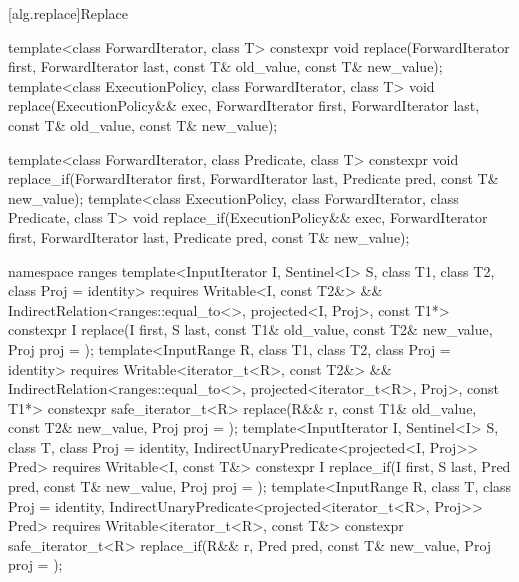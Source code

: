 [alg.replace]{Replace}

%
%
\begin{itemdecl}
template<class ForwardIterator, class T>
  constexpr void replace(ForwardIterator first, ForwardIterator last,
                         const T& old_value, const T& new_value);
template<class ExecutionPolicy, class ForwardIterator, class T>
  void replace(ExecutionPolicy&& exec,
               ForwardIterator first, ForwardIterator last,
               const T& old_value, const T& new_value);

template<class ForwardIterator, class Predicate, class T>
  constexpr void replace_if(ForwardIterator first, ForwardIterator last,
                            Predicate pred, const T& new_value);
template<class ExecutionPolicy, class ForwardIterator, class Predicate, class T>
  void replace_if(ExecutionPolicy&& exec,
                  ForwardIterator first, ForwardIterator last,
                  Predicate pred, const T& new_value);

namespace ranges {
  template<InputIterator I, Sentinel<I> S, class T1, class T2, class Proj = identity>
    requires Writable<I, const T2&> &&
             IndirectRelation<ranges::equal_to<>, projected<I, Proj>, const T1*>
    constexpr I
      replace(I first, S last, const T1& old_value, const T2& new_value, Proj proj = {});
  template<InputRange R, class T1, class T2, class Proj = identity>
    requires Writable<iterator_t<R>, const T2&> &&
             IndirectRelation<ranges::equal_to<>, projected<iterator_t<R>, Proj>, const T1*>
    constexpr safe_iterator_t<R>
      replace(R&& r, const T1& old_value, const T2& new_value, Proj proj = {});
  template<InputIterator I, Sentinel<I> S, class T, class Proj = identity,
           IndirectUnaryPredicate<projected<I, Proj>> Pred>
    requires Writable<I, const T&>
    constexpr I replace_if(I first, S last, Pred pred, const T& new_value, Proj proj = {});
  template<InputRange R, class T, class Proj = identity,
           IndirectUnaryPredicate<projected<iterator_t<R>, Proj>> Pred>
    requires Writable<iterator_t<R>, const T&>
    constexpr safe_iterator_t<R>
      replace_if(R&& r, Pred pred, const T& new_value, Proj proj = {});
}
\end{itemdecl}

